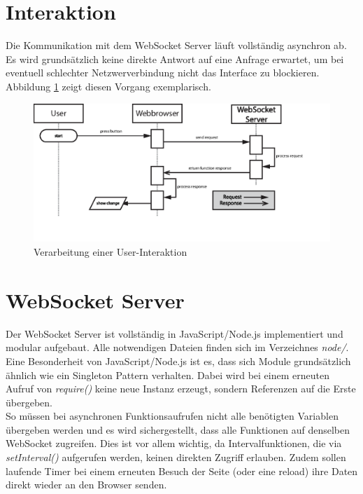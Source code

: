 \section{Interaktion}
Die Kommunikation mit dem WebSocket Server läuft vollständig asynchron ab. Es wird grundsätzlich keine direkte Antwort auf eine Anfrage erwartet, um bei eventuell schlechter Netzwerverbindung nicht das Interface zu blockieren. Abbildung \ref{fig:interaction} zeigt diesen Vorgang exemplarisch.

\begin{figure}[ht]
\includegraphics[width = \textwidth]{documentation/images/sendRequest.eps}
\caption{Verarbeitung einer User-Interaktion}
\label{fig:interaction}
\end{figure}


\section{WebSocket Server}
Der WebSocket Server ist vollständig in JavaScript/Node.js implementiert und modular aufgebaut. Alle notwendigen Dateien finden sich im Verzeichnes \textit{node/}.\\
Eine Besonderheit von JavaScript/Node.js ist es, dass sich Module grundsätzlich ähnlich wie ein Singleton Pattern verhalten. Dabei wird bei einem erneuten Aufruf von \textit{require()} keine neue Instanz erzeugt, sondern Referenzen auf die Erste übergeben.\\
So müssen bei asynchronen Funktionsaufrufen nicht alle benötigten Variablen übergeben werden und es wird sichergestellt, dass alle Funktionen auf denselben WebSocket zugreifen. Dies ist vor allem wichtig, da Intervalfunktionen, die via \textit{setInterval()} aufgerufen werden, keinen direkten Zugriff erlauben. Zudem sollen laufende Timer bei einem erneuten Besuch der Seite (oder eine reload) ihre Daten direkt wieder an den Browser senden.

